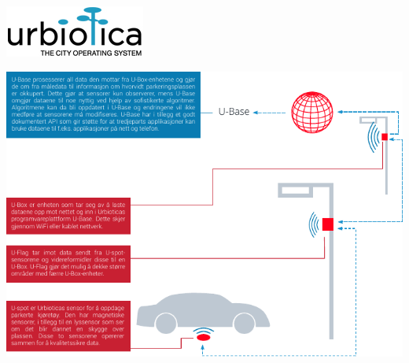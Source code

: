 \documentclass[xetex]{beamer}
\begin{document}
\begin{frame}
	\bigskip
	\vfill\hfill\includegraphics[scale=0.2]{grafikk/logoer/urbiotica.jpg} \\ [-1em]
	\bigskip
	\centerline{\includegraphics{grafikk/eksisterende_systemer/urbiotica_smaller.pdf}}
\end{frame}
\end{document}
